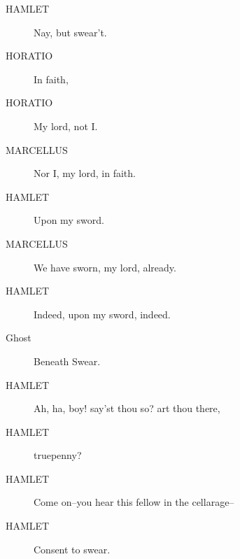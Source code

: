 \documentclass{article}
\begin{document}
\begin{description}
            
\item[HAMLET] Nay, but swear't.
\end{description}
          
\begin{description}
            
\item[HORATIO] In faith,
\item[HORATIO] My lord, not I.
\end{description}
          
\begin{description}
            
\item[MARCELLUS] Nor I, my lord, in faith.
\end{description}
          
\begin{description}
            
\item[HAMLET] Upon my sword.
\end{description}
          
\begin{description}
            
\item[MARCELLUS] We have sworn, my lord, already.
\end{description}
          
\begin{description}
            
\item[HAMLET] Indeed, upon my sword, indeed.
\end{description}
          
\begin{description}
            
\item[Ghost] 
               Beneath  Swear.
\end{description}
          
\begin{description}
            
\item[HAMLET] Ah, ha, boy! say'st thou so? art thou there,
\item[HAMLET] truepenny?
\item[HAMLET] Come on--you hear this fellow in the cellarage--
\item[HAMLET] Consent to swear.
\end{description}
          
\end{document}
